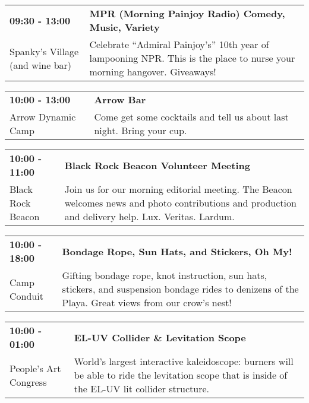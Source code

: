 \begin{tabular}{ p{1in} p{2.2in} }
    \textbf{09:30 - 13:00} & \textbf{MPR (Morning Painjoy Radio) Comedy, Music, Variety} \\
    Spanky's Village (and wine bar) \newline  & Celebrate ``Admiral Painjoy's'' 10th year of lampooning NPR.  This is the place to nurse your morning hangover.  Giveaways! \\
    \hline 
\end{tabular}
    
\begin{tabular}{ p{1in} p{2.2in} }
    \textbf{10:00 - 13:00} & \textbf{Arrow Bar} \\
    Arrow Dynamic Camp \newline  & Come get some cocktails and tell us about last night. Bring your cup. \\
    \hline 
\end{tabular}
    
\begin{tabular}{ p{1in} p{2.2in} }
    \textbf{10:00 - 11:00} & \textbf{Black Rock Beacon Volunteer Meeting} \\
    Black Rock Beacon \newline  & Join us for our morning editorial meeting. The Beacon welcomes news and photo contributions and production and delivery help. Lux. Veritas. Lardum. \\
    \hline 
\end{tabular}
    
\begin{tabular}{ p{1in} p{2.2in} }
    \textbf{10:00 - 18:00} & \textbf{Bondage Rope, Sun Hats, and Stickers, Oh My!} \\
    Camp Conduit \newline  & Gifting bondage rope, knot instruction, sun hats, stickers, and suspension bondage rides to denizens of the Playa. Great views from our crow's nest! \\
    \hline 
\end{tabular}
    
\begin{tabular}{ p{1in} p{2.2in} }
    \textbf{10:00 - 01:00} & \textbf{EL-UV Collider \& Levitation Scope} \\
    People's Art Congress \newline  & World's largest interactive kaleidoscope: burners will be able to ride the levitation scope that is inside of the EL-UV lit collider structure. \\
    \hline 
\end{tabular}
    
